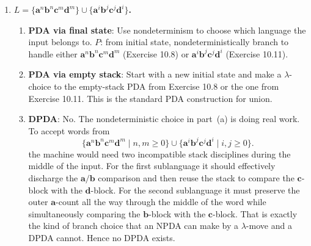 \begin{enumerate}[{10.}1. ]
\textbf{Claim} ($P(n)$): For all $n$, for all states $s,t$, stack symbol $A$, string $x$: $A^{st}\DRightarrow x$ in $n$ steps iff $\langle s,x,A\rangle\Dvdash\langle t,\lambda,\lambda\rangle$ in $n$ moves.

\textbf{Base} ($n=1$): $A^{st} \to a$ (terminal production from grammar of Definition 10.7) corresponds to $\delta(s,a,A) \ni \langle t,\lambda\rangle$, giving $\langle s,a,A\rangle\vdash\langle t,\lambda,\lambda\rangle$. \checkmark

\textbf{Step}: Assume $P(k)$ for all $k < n$. A derivation $A^{st}\DRightarrow x$ of length $n$ begins with $A^{st} \Rightarrow a B_1^{s_0 s_1} B_2^{s_1 s_2}\cdots B_m^{s_{m-1} t}$ (using a production from $\delta(s,a,A)\ni\langle s_0,B_1\cdots B_m\rangle$). Then each $B_i^{s_{i-1}s_i}$ independently derives $x_i$ in fewer than $n$ steps. By IH, $\langle s_{i-1},x_i,B_i\rangle\Dvdash\langle s_i,\lambda,\lambda\rangle$. Chaining: $\langle s,ax_1\cdots x_m,A\rangle\vdash\langle s_0,x_1\cdots x_m,B_1\cdots B_m\rangle\Dvdash\langle t,\lambda,\lambda\rangle$. So $x = ax_1\cdots x_m$ and $\langle s,x,A\rangle\Dvdash\langle t,\lambda,\lambda\rangle$. \qed

\item \textbf{$L=\{\pmb{a}^n\pmb{b}^n\pmb{c}^m\pmb{d}^m\}\cup\{\pmb{a}^i\pmb{b}^j\pmb{c}^j\pmb{d}^i\}$.}

\begin{enumerate}
\item \textbf{PDA via final state}: Use nondeterminism to choose which language the input belongs to.
$P$: from initial state, nondeterministically branch to handle either $\pmb{a}^n\pmb{b}^n\pmb{c}^m\pmb{d}^m$ (Exercise 10.8) or $\pmb{a}^i\pmb{b}^j\pmb{c}^j\pmb{d}^i$ (Exercise 10.11).

\item \textbf{PDA via empty stack}: Start with a new initial state and make a $\lambda$-choice to the empty-stack PDA from Exercise 10.8 or the one from Exercise 10.11. This is the standard PDA construction for union.

\item \textbf{DPDA}: No. The nondeterministic choice in part~(a) is doing real
work. To accept words from
\[
\{\pmb{a}^n\pmb{b}^n\pmb{c}^m\pmb{d}^m\mid n,m\geq 0\}\cup
\{\pmb{a}^i\pmb{b}^j\pmb{c}^j\pmb{d}^i\mid i,j\geq 0\}.
\]
the machine would need two incompatible stack disciplines during the middle of
the input. For the first sublanguage it should effectively discharge the
$\pmb{a}/\pmb{b}$ comparison and then reuse the stack to compare the
$\pmb{c}$-block with the $\pmb{d}$-block. For the second sublanguage it must
preserve the outer $\pmb{a}$-count all the way through the middle of the word
while simultaneously comparing the $\pmb{b}$-block with the $\pmb{c}$-block.
That is exactly the kind of branch choice that an NPDA can make by a
$\lambda$-move and a DPDA cannot. Hence no DPDA exists.


\end{enumerate}
\end{enumerate}
